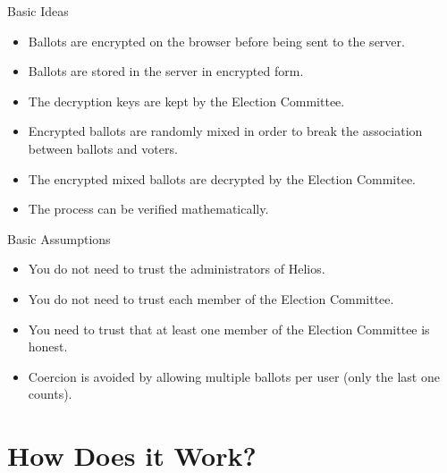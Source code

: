 \documentclass[utf8]{beamer}
\begin{document}
\begin{frame}{Basic Ideas}

\begin{itemize}
\item Ballots are encrypted on the browser before being sent to the
  server.
\item Ballots are stored in the server in encrypted form.
\item The decryption keys are kept by the Election Committee.
\item Encrypted ballots are randomly mixed in order to break the
  association between ballots and voters.
\item The encrypted mixed ballots are decrypted by the Election
  Commitee.
\item The process can be verified mathematically.
\end{itemize}

\end{frame}

\begin{frame}{Basic Assumptions}

\begin{itemize}
\item You do not need to trust the administrators of Helios.
\item You do not need to trust each member of the Election Committee.
\item You need to trust that at least one member of the Election
  Committee is honest.
\item Coercion is avoided by allowing multiple ballots per user (only
  the last one counts).
\end{itemize}

\end{frame}

\section{How Does it Work?}
\end{document}
